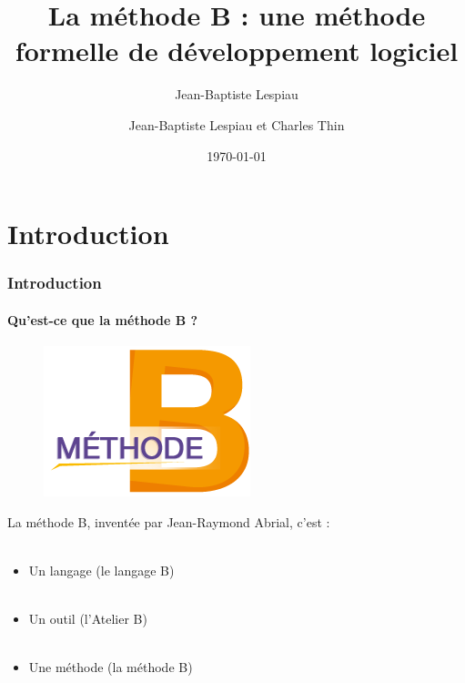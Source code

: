 \documentclass[11pt,a4paper,xcolor=table]{beamer} %
\author[]{Jean-Baptiste Lespiau}
\author{Jean-Baptiste Lespiau et Charles Thin}
\title{La méthode B : une méthode formelle de développement logiciel}
\date\today
\begin{document}
\frame{\titlepage}

\section*{Introduction}

\begin{frame}
\frametitle{Introduction}
\framesubtitle{Qu'est-ce que la méthode B ?}
\begin{figure}[h]
\includegraphics[scale=0.2]{ressources/logo1.png}
\end{figure}
La méthode B, inventée par Jean-Raymond Abrial, c'est :\\~\\
\begin{itemize}
\item Un langage (le langage B)\\~\\
\pause
\item Un outil (l'Atelier B)\\~\\
\pause
\item Une méthode (la méthode B)
\end{itemize}
\end{frame}
\end{document}
